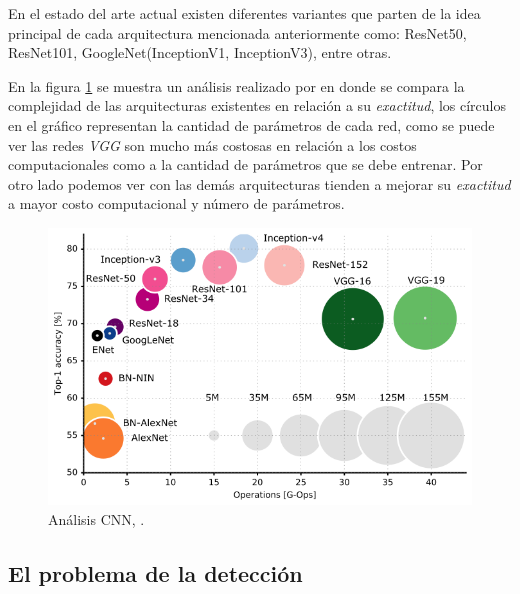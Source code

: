 En el estado del arte actual existen diferentes variantes que parten de la idea principal de cada arquitectura mencionada anteriormente como: ResNet50, ResNet101, GoogleNet(InceptionV1, InceptionV3), entre otras. 

En la  figura \ref{Fig:cnn-analisis} se muestra un análisis realizado por \cite{Analysis_deep_network} en donde se compara la complejidad de las arquitecturas existentes en relación a su \textit{exactitud}, los círculos en el gráfico representan la cantidad de parámetros de cada red, como se puede ver las redes \textit{VGG} son mucho más costosas en relación a los costos computacionales como a la cantidad de parámetros que se debe entrenar. Por otro lado podemos ver con las demás arquitecturas tienden a mejorar su \textit{exactitud} a mayor costo computacional y número de parámetros.

\begin{figure}[H]
 \centering
  \includegraphics[scale=0.5,keepaspectratio=true,clip=true]{imagenes/MarcoTeorico/cnn-analisis.png}
  \caption{Análisis CNN, \citep{cazani_grap}.}\label{Fig:cnn-analisis}
\end{figure}



\subsection{El problema de la detección}\label{sub:problema_deteccion}


